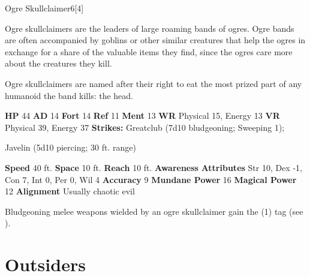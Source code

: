   \begin{monsubsection}{Ogre Skullclaimer}{6}[4]
    \vspace{-1em}\vspace{-1em}
    \vspace{0em}

    
          Ogre skullclaimers are the leaders of large roaming bands of ogres.
          Ogre bands are often accompanied by goblins or other similar creatures that help the ogres in exchange for a share of the valuable items they find, since the ogres care more about the creatures they kill.
        
          Ogre skullclaimers are named after their right to eat the most prized part of any humanoid the band kills: the head.
        

    \begin{spellcontent}
      \begin{spelltargetinginfo}
        \pari \textbf{HP} 44 \monsep
          \textbf{AD} 14 \monsep
          \textbf{Fort} 14 \monsep
          \textbf{Ref} 11 \monsep
          \textbf{Ment} 13
        \pari \textbf{WR} Physical 15, Energy 13 \monsep
        \textbf{VR} Physical 39, Energy 37
        \pari \textbf{Strikes:}
            Greatclub  (7d10 bludgeoning; Sweeping 1);
\par Javelin  (5d10 piercing; 30 ft. range)
      \end{spelltargetinginfo}
    \end{spellcontent}
    \begin{monsterfooter}
      \pari \textbf{Speed} 40 ft. \monsep
        \textbf{Space} 10 ft. \monsep
        \textbf{Reach} 10 ft.
      \pari \textbf{Awareness} 
      \pari \textbf{Attributes}
        Str 10, Dex -1,
        Con 7, Int 0,
        Per 0, Wil 4
      \pari \textbf{Accuracy} 9 \monsep
        \textbf{Mundane Power} 16 \monsep
      \textbf{Magical Power} 12
      \pari \textbf{Alignment} Usually chaotic evil
    \end{monsterfooter}
  \end{monsubsection}
            Bludgeoning melee weapons wielded by an ogre skullclaimer gain the  (1) tag (see ).
  
  
        \newpage
        \section{Outsiders}

